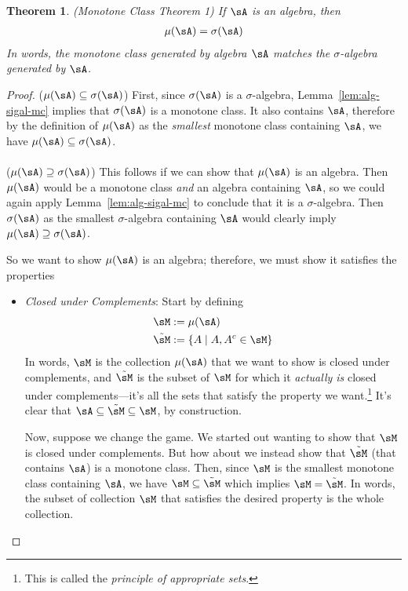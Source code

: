 \documentclass[12pt]{article}
\theoremstyle{plain}
\newtheorem{thm}{Theorem}[section]
\theoremstyle{definition}
\theoremstyle{remark}
\begin{document}
\begin{thm}\emph{(Monotone Class Theorem 1)}
\label{thm:mct-1}
If $\sA$ is an algebra, then
\begin{align*}
  \mu(\sA) = \sigma(\sA)
\end{align*}
In words, the monotone class generated by algebra $\sA$ matches the
$\sigma$-algebra generated by $\sA$.
\end{thm}
\begin{proof}
($\mu(\sA) \subseteq \sigma(\sA)$)
First, since $\sigma(\sA)$ is a $\sigma$-algebra,
Lemma~\ref{lem:alg-sigal-mc} implies that $\sigma(\sA)$ is a monotone
class. It also contains $\sA$, therefore by the definition of
$\mu(\sA)$ as the \emph{smallest} monotone class containing $\sA$, we
have $\mu(\sA) \subseteq \sigma(\sA)$.
\\
\\
($\mu(\sA) \supseteq \sigma(\sA)$)
This follows if we can show that $\mu(\sA)$ is an algebra. Then
$\mu(\sA)$ would be a monotone class \emph{and} an algebra containing
$\sA$, so we could again apply Lemma~\ref{lem:alg-sigal-mc} to conclude
that it is a $\sigma$-algebra. Then $\sigma(\sA)$ as the smallest
$\sigma$-algebra containing $\sA$ would clearly imply
$\mu(\sA) \supseteq \sigma(\sA)$.

So we want to show $\mu(\sA)$ is an algebra; therefore, we must show
it satisfies the properties
\begin{itemize}
  \item \emph{Closed under Complements}:
    Start by defining
    \begin{align*}
      \sM :=& \;\mu(\sA) \\
      \tilde{\sM} :=& \; \{A\;|\; A,A^c\in\sM\}
    \end{align*}
    In words, $\sM$ is the collection $\mu(\sA)$ that we want to show is
    closed under complements, and $\tilde{\sM}$ is the subset of $\sM$
    for which it \emph{actually is} closed under complements---it's all
    the sets that satisfy the property we want.\footnote{%
      This is called the \emph{principle of appropriate sets}.
    }
    It's clear that $\sA\subseteq \tilde{\sM} \subseteq\sM$, by
    construction.

    Now, suppose we change the game. We started out wanting to show that
    $\sM$ is closed under complements. But how about we instead show
    that $\tilde{\sM}$ (that contains $\sA$) is a monotone class. Then,
    since $\sM$ is the smallest monotone class containing $\sA$, we have
    $\sM\subseteq\tilde{\sM}$ which implies $\sM=\tilde{\sM}$. In words,
    the subset of collection $\sM$ that satisfies the desired property
    is the whole collection.


\end{itemize}
\end{proof}
\end{document}
